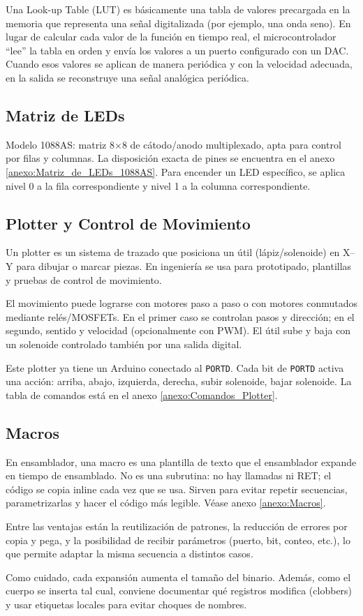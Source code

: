 Una Look-up Table (LUT) es básicamente una tabla de valores precargada en la memoria que representa una señal digitalizada (por ejemplo, una onda seno). En lugar de calcular cada valor de la función en tiempo real, el microcontrolador ``lee'' la tabla en orden y envía los valores a un puerto configurado con un DAC. Cuando esos valores se aplican de manera periódica y con la velocidad adecuada, en la salida se reconstruye una señal analógica periódica.
    
\newpage

\subsection{Matriz de LEDs}
Modelo 1088AS: matriz 8×8 de cátodo/anodo multiplexado, apta para control por filas y columnas. La disposición exacta de pines se encuentra en el anexo \ref{anexo:Matriz_de_LEDs_1088AS}. Para encender un LED específico, se aplica nivel 0 a la fila correspondiente y nivel 1 a la columna correspondiente.


\subsection{Plotter y Control de Movimiento}
Un plotter es un sistema de trazado que posiciona un útil (lápiz/solenoide) en X–Y para dibujar o marcar piezas. En ingeniería se usa para prototipado, plantillas y pruebas de control de movimiento.

El movimiento puede lograrse con motores paso a paso o con motores conmutados mediante relés/MOSFETs. En el primer caso se controlan pasos y dirección; en el segundo, sentido y velocidad (opcionalmente con PWM). El útil sube y baja con un solenoide controlado también por una salida digital.

Este plotter ya tiene un Arduino conectado al \texttt{PORTD}. Cada bit de \texttt{PORTD} activa una acción: arriba, abajo, izquierda, derecha, subir solenoide, bajar solenoide. La tabla de comandos está en el anexo \ref{anexo:Comandos_Plotter}.


\subsection{Macros}
En ensamblador, una macro es una plantilla de texto que el ensamblador expande en tiempo de ensamblado. No es una subrutina: no hay llamadas ni RET; el código se copia inline cada vez que se usa. Sirven para evitar repetir secuencias, parametrizarlas y hacer el código más legible. Véase anexo \ref{anexo:Macros}.

Entre las ventajas están la reutilización de patrones, la reducción de errores por copia y pega, y la posibilidad de recibir parámetros (puerto, bit, conteo, etc.), lo que permite adaptar la misma secuencia a distintos casos.

Como cuidado, cada expansión aumenta el tamaño del binario. Además, como el cuerpo se inserta tal cual, conviene documentar qué registros modifica (clobbers) y usar etiquetas locales para evitar choques de nombres.



